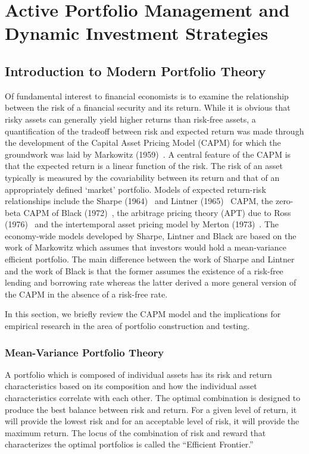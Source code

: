 
\chapter{Active Portfolio Management and Dynamic Investment Strategies \label{ch:amp}}

\section{Introduction to Modern Portfolio Theory \label{s:mod_port_theory}}


Of fundamental interest to financial economists is to examine the relationship between the risk of a financial security and its return. While it is obvious that risky assets can generally yield higher returns than risk-free assets, a quantification of the tradeoff between risk and expected return was made through the development of the Capital Asset Pricing Model (CAPM) for which the groundwork was laid by Markowitz (1959)~\cite{markport}. A central feature of the CAPM is that the expected return is a linear function of the risk. The risk of an asset typically is measured by the covariability between its return and that of an appropriately defined `market' portfolio. Models of expected return-risk relationships include the Sharpe (1964)~\cite{sharpcap} and Lintner (1965)~\cite{lint65} CAPM, the zero-beta CAPM of Black (1972)~\cite{blackcap}, the arbitrage pricing theory (APT) due to Ross (1976)~\cite{rossarb} and the intertemporal asset pricing model by Merton (1973)~\cite{mertonint}. The economy-wide models developed by Sharpe, Lintner and Black are based on the work of Markowitz which assumes that investors would hold a mean-variance efficient portfolio. The main difference between the work of Sharpe and Lintner and the work of Black is that the former assumes the existence of a risk-free lending and borrowing rate whereas the latter derived a more general version of the CAPM in the absence of a risk-free rate.


In this section, we briefly review the CAPM model and the implications for empirical research in the area of portfolio construction and testing. 



\subsection{Mean-Variance Portfolio Theory}


A portfolio which is composed of individual assets has its risk and return characteristics based on its composition and how the individual asset characteristics correlate with each other. The optimal combination is designed to produce the best balance between risk and return. For a given level of return, it will provide the lowest risk and for an acceptable level of risk, it will provide the maximum return. The locus of the combination of risk and reward that characterizes the optimal portfolios is called the ``Efficient Frontier.''


